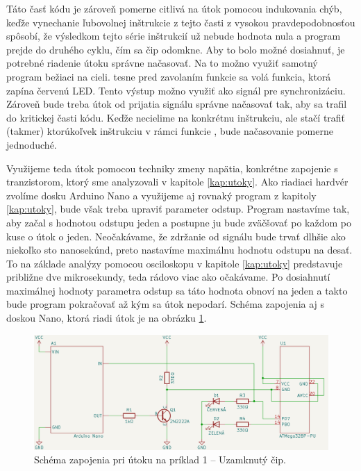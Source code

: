 Táto časť kódu je zároveň pomerne citlivá na útok pomocou indukovania chýb, keďže vynechanie ľubovolnej inštrukcie z tejto časti z vysokou pravdepodobnosťou spôsobí, že výsledkom tejto série inštrukcií už nebude hodnota nula a program prejde do druhého cyklu, čím sa čip odomkne. Aby to bolo možné dosiahnuť, je potrebné riadenie útoku správne načasovať. Na to možno využiť samotný program bežiaci na cieli. tesne pred zavolaním funkcie  sa volá funkcia, ktorá zapína červenú LED. Tento výstup možno využiť ako signál pre synchronizáciu. Zároveň bude treba útok od prijatia signálu správne načasovať tak, aby sa trafil do kritickej časti kódu. Keďže necielime na konkrétnu inštrukciu, ale stačí trafiť (takmer) ktorúkoľvek inštrukciu v rámci funkcie , bude načasovanie pomerne jednoduché.

Využijeme teda útok pomocou techniky zmeny napätia, konkrétne zapojenie s tranzistorom, ktorý sme analyzovali v kapitole \ref{kap:utoky}. Ako riadiaci hardvér zvolíme dosku Arduino Nano a využijeme aj rovnaký program z kapitoly \ref{kap:utoky}, bude však treba upraviť parameter odstup. Program nastavíme tak, aby začal s hodnotou odstupu jeden a postupne ju bude zväčšovať po každom po kuse o útok o jeden. Neočakávame, že zdržanie od signálu bude trvať dlhšie ako niekoľko sto nanosekúnd, preto nastavíme maximálnu hodnotu odstupu na desať. To na základe analýzy pomocou osciloskopu v kapitole \ref{kap:utoky} predstavuje približne dve mikrosekundy, teda rádovo viac ako očakávame. Po dosiahnutí maximálnej hodnoty parametra odstup sa táto hodnota obnoví na jeden a takto bude program pokračovať až kým sa útok nepodarí. Schéma zapojenia aj s doskou Nano, ktorá riadi útok je na obrázku \ref{obr:schemeCTF-LED}.

\begin{figure}
    \centerline{\includegraphics[width=1\textwidth]{images/schemeCTF-LED.png}}
    \caption[Schéma zapojenia pri útoku na príklad 1]{Schéma zapojenia pri útoku na príklad 1 -- Uzamknutý čip.}
    \label{obr:schemeCTF-LED}
\end{figure}

